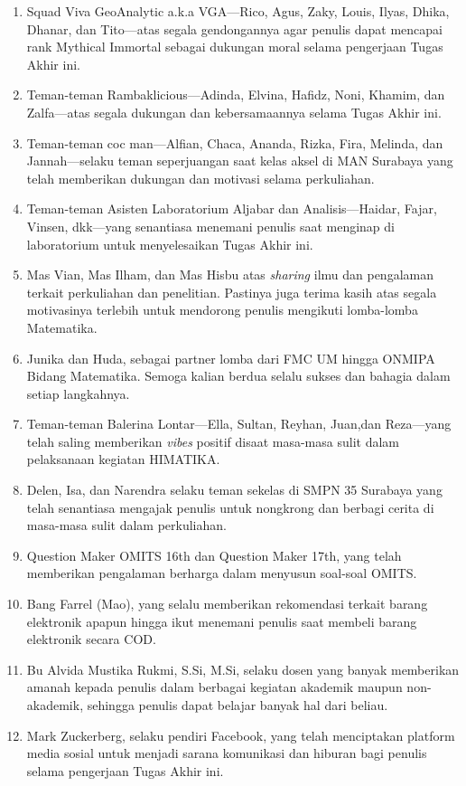\begin{enumerate}
  \item Squad Viva GeoAnalytic a.k.a VGA---Rico, Agus, Zaky, Louis, Ilyas, Dhika, Dhanar, dan Tito---atas segala gendongannya agar penulis dapat mencapai rank Mythical Immortal sebagai dukungan moral selama pengerjaan Tugas Akhir ini.
  \item Teman-teman Rambaklicious---Adinda, Elvina, Hafidz, Noni, Khamim, dan Zalfa---atas segala dukungan dan kebersamaannya selama Tugas Akhir ini.
  \item Teman-teman coc man---Alfian, Chaca, Ananda, Rizka, Fira, Melinda, dan Jannah---selaku teman seperjuangan saat kelas aksel di MAN Surabaya yang telah memberikan dukungan dan motivasi selama perkuliahan.
  \item Teman-teman Asisten Laboratorium Aljabar dan Analisis---Haidar, Fajar, Vinsen, dkk---yang senantiasa menemani penulis saat menginap di laboratorium untuk menyelesaikan Tugas Akhir ini.
  \item Mas Vian, Mas Ilham, dan Mas Hisbu atas \textit{sharing} ilmu dan pengalaman terkait perkuliahan dan penelitian. Pastinya juga terima kasih atas segala motivasinya terlebih untuk mendorong penulis mengikuti lomba-lomba Matematika.
  \item Junika dan Huda, sebagai partner lomba dari FMC UM hingga ONMIPA Bidang Matematika. Semoga kalian berdua selalu sukses dan bahagia dalam setiap langkahnya.
  \item Teman-teman Balerina Lontar---Ella, Sultan, Reyhan, Juan,dan Reza---yang telah saling memberikan \textit{vibes} positif disaat masa-masa sulit dalam pelaksanaan kegiatan HIMATIKA.
  \item Delen, Isa, dan Narendra selaku teman sekelas di SMPN 35 Surabaya yang telah senantiasa mengajak penulis untuk nongkrong dan berbagi cerita di masa-masa sulit dalam perkuliahan.
  \item Question Maker OMITS 16th dan Question Maker 17th, yang telah memberikan pengalaman berharga dalam menyusun soal-soal OMITS.
  \item Bang Farrel (Mao), yang selalu memberikan rekomendasi terkait barang elektronik apapun hingga ikut menemani penulis saat membeli barang elektronik secara COD.
  \item Bu Alvida Mustika Rukmi, S.Si, M.Si, selaku dosen yang banyak memberikan amanah kepada penulis dalam berbagai kegiatan akademik maupun non-akademik, sehingga penulis dapat belajar banyak hal dari beliau.
  \item Mark Zuckerberg, selaku pendiri Facebook, yang telah menciptakan platform media sosial untuk menjadi sarana komunikasi dan hiburan bagi penulis selama pengerjaan Tugas Akhir ini.

\end{enumerate}
